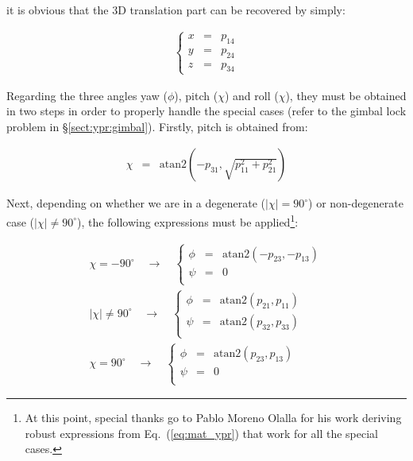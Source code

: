\documentclass[a4paper,10pt]{report}
\begin{document}
\noindent it is obvious that the 3D translation part can be recovered by simply:

\begin{eqnarray*}
 \left\{
  \begin{array}{rcl}
    x &=& p_{14} \\
    y &=& p_{24} \\
    z &=& p_{34} 
  \end{array}
  \right.
\end{eqnarray*}

Regarding the three angles yaw ($\phi$), pitch ($\chi$) and roll ($\chi$), they must be obtained 
in two steps in order to properly handle the special cases 
(refer to the gimbal lock problem in \S \ref{sect:ypr:gimbal}).
Firstly, pitch is obtained from:

\begin{eqnarray}
  \chi &=& \mathrm{atan2} \left( -p_{31} , \sqrt{ p_{11}^2 + p_{21}^2 } \right) 
\end{eqnarray}

Next, depending on whether we are in a degenerate ($|\chi|=90^\circ$) or 
non-degenerate case ($|\chi| \neq 90^\circ$), the following expressions must
be applied\footnote{At this point, special thanks go to 
Pablo Moreno Olalla for his work deriving robust expressions from Eq.~(\ref{eq:mat_ypr}) 
that work for all the special cases.}:

\begin{eqnarray}
  \chi = -90^\circ \quad \longrightarrow \quad
   \left\{
  \begin{array}{rcl}
    \phi  &=& \mathrm{atan2}( -p_{23}, -p_{13} ) \\
    \psi  &=& 0 \\
  \end{array}
   \right. 
\\
  |\chi| \neq 90^\circ \quad \longrightarrow \quad
   \left\{
  \begin{array}{rcl}
    \phi   &=& \mathrm{atan2}(p_{21},p_{11}) \\
    \psi  &=&  \mathrm{atan2}(p_{32},p_{33}) \\
  \end{array}
   \right. 
\\
  \chi = 90^\circ \quad \longrightarrow \quad
   \left\{
  \begin{array}{rcl}
    \phi  &=& \mathrm{atan2}( p_{23}, p_{13} ) \\
    \psi  &=& 0 \\
  \end{array}
   \right. 
\end{eqnarray}
\end{document}
